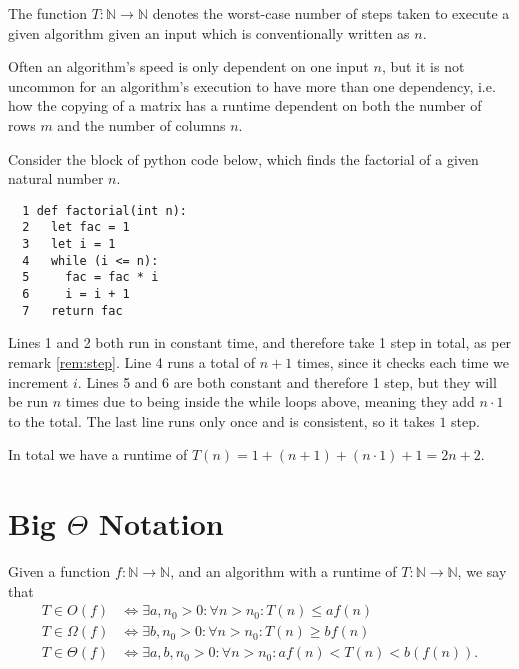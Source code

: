 \documentclass{article}
\begin{document}
 \begin{definition}\label{def:T}
  The function $T : \mathbb{N}\to\mathbb{N}$ denotes the worst-case number of steps taken to execute a given algorithm given an input which is conventionally written as $n$.
 \end{definition}
 \begin{remark}
  Often an algorithm's speed is only dependent on one input $n$, but it is not uncommon for an algorithm's execution to have more than one dependency, i.e. how the copying of a matrix has a runtime dependent on both the number of rows $m$ and the number of columns $n$.
 \end{remark}
 \begin{example}\label{ex:1}
 Consider the block of python code below, which finds the factorial of a given natural number $n$.
 \begin{lstlisting}
  1 def factorial(int n):
  2   let fac = 1
  3   let i = 1
  4   while (i <= n):
  5     fac = fac * i
  6     i = i + 1
  7   return fac
 \end{lstlisting}
  Lines 1 and 2 both run in constant time, and therefore take 1 step in total, as per remark \ref{rem:step}. Line 4 runs a total of $n+1$ times, since it checks each time we increment $i$. Lines 5 and 6 are both constant and therefore 1 step, but they will be run $n$ times due to being inside the while loops above, meaning they add $n\cdot1$ to the total. The last line runs only once and is consistent, so it takes $1$ step.

  In total we have a runtime of $T(n) = 1+(n+1)+(n\cdot1)+1 = 2n+2$.

 \end{example}



 \section{Big $\Theta$ Notation} %

 \begin{definition}\label{def:BigTheta}
  Given a function $f:\mathbb{N}\to\mathbb{N}$, and an algorithm with a runtime of $T:\mathbb{N}\to\mathbb{N}$, we say that
  \begin{align*}
  T\in O(f) &\Longleftrightarrow \exists a,n_0>0 : \forall n>n_0 : T(n)\leq af(n) \\
  T\in \Omega(f) &\Longleftrightarrow \exists b,n_0>0 : \forall n>n_0 : T(n)\geq bf(n) \\
  T\in \Theta(f) &\Longleftrightarrow \exists a,b,n_0>0 : \forall n>n_0 : af(n) < T(n) < b(f(n)).
  \end{align*}\cite{blum06}
 \end{definition}
\end{document}
